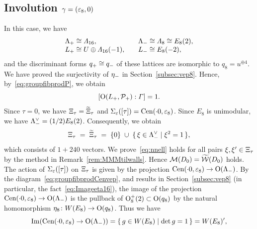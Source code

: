 \documentclass{amsart} %
\begin{document}
\subsection{Involution $\gamma=(\varepsilon_8, 0)$}\label{subsec:walls8}
%
In this case, we have
\[
\begin{array}{ll}
\Lambda_{+}\cong \varLambda_{16}, \quad &\Lambda_{-}\cong \varLambda_{8}\cong E_8(2),\\
L_{+}\cong U\oplus \varLambda_{16}(-1), \quad &L_{-}\cong E_8(-2),
\end{array}
\]
%
and the discriminant forms $q_{+}\cong q_{-}$ of these lattices are 
isomorphic to $q_8=u^{\oplus 4}$.
We have proved the surjectivity of ${\eta}_{-}$ in Section~\ref{subsec:vep8}.
Hence, by~\eqref{eq:groupfibprodP}, we obtain 
\[
[\mathord{\mathrm{O}}(L_{+}, \mathord{\mathcal{P}}_{+}): \varGamma]=1.
\]
%
%
Since $\tau=0$,
we have $\Xi_{\tau}=\widetilde{\Xi}_{\tau} $ and $\Sigma_{\varepsilon}([\tau])=\mathrm{Cen}(\cdot 0, \varepsilon_{8})$.
Since $E_8$ is unimodular, we have $\Lambda_{-}^{\vee}=(1/2)E_8(2)$.
Consequently, we obtain 
\[
\Xi_{\tau}\;=\;\widetilde{\Xi}_{\tau} \; =\; \{0\}\;\cup\;\{\,{\xi\in \Lambda_{-}^{\vee}}\mid {\xi^2=1} \,\},
\]
which consists of $1+240$ vectors.
We prove~\eqref{eq:nnell} holds for all pairs $\xi, \xi^{\prime}\in \Xi_{\tau}$
by the method in Remark~\ref{rem:MMMtilwalls}.
Hence 
$\mathord{\mathcal{M}}(D_0)=\widetilde{\mathord{\mathcal{W}}}(D_0)$ holds.
%
%
%
The action of $\Sigma_{\varepsilon}([\tau])$ on $\Xi_{\tau}$
is given by the projection 
$\mathrm{Cen}(\cdot 0, \varepsilon_{8})\to \mathord{\mathrm{O}}(\Lambda_{-})$.
By the diagram~\eqref{eq:groupfibprodCenvep}, and results in Section~\ref{subsec:vep8}
(in particular, the fact~\eqref{eq:Imageeta16}), 
the image of the projection $\mathrm{Cen}(\cdot 0, \varepsilon_{8})\to \mathord{\mathrm{O}}(\Lambda_{-})$ is 
the pullback of $\mathord{\mathrm{O}}^{+}_8(2)\subset \mathord{\mathrm{O}}(q_8)$ by the natural homomorphism 
$\eta_8\colon W(E_8)\to \mathord{\mathrm{O}}(q_8)$.
Thus we have 
\[
\operatorname{Im}(\mathrm{Cen}(\cdot 0, \varepsilon_{8})\to \mathord{\mathrm{O}}(\Lambda_{-}) )=\{\,{g\in W(E_8)}\mid {\det g=1} \,\}=W(E_8)^{\prime},
\]
\end{document}
